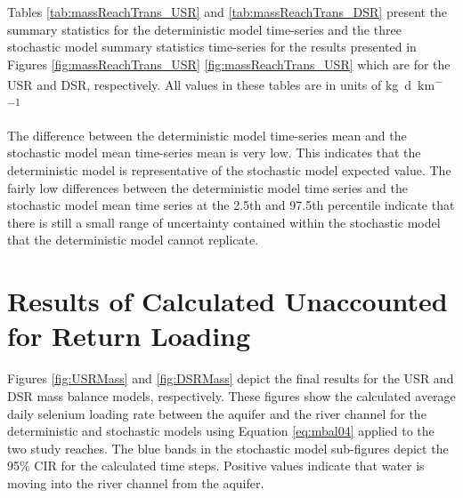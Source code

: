 Tables \ref{tab:massReachTrans_USR} and \ref{tab:massReachTrans_DSR} present the summary statistics for the deterministic model time-series and the three stochastic model summary statistics time-series for the results presented in Figures \ref{fig:massReachTrans_USR} \ref{fig:massReachTrans_USR} which are for the USR and DSR, respectively.  All values in these tables are in units of \si{\kilo\gram\per\day\per\kilo\meter}

\subtabletop
\begin{table}[htbp]
	\centering
	\caption[USR deterministic and stochastic dissolved selenium mass transport time-series results tables.]{USR deterministic and stochastic dissolved selenium mass transport time-series results tables.  Values are in units of \si{\kilo\gram\per\day\per\kilo\meter}.}
	\label{tab:massReachTrans_USR}
	
	\tablevspace
\end{table}
\begin{table}[htbp]
	\centering
	\caption[USR deterministic and stochastic dissolved selenium mass transport time-series results tables.]{USR deterministic and stochastic dissolved selenium mass transport time-series results tables.  Values are in units of \si{\kilo\gram\per\day\per\kilo\meter}.}
	\label{tab:massReachTrans_DSR}
	
\end{table}

The difference between the deterministic model time-series mean and the stochastic model mean time-series mean is very low.  This indicates that the deterministic model is representative of the stochastic model expected value.  The fairly low differences between the deterministic model time series and the stochastic model mean time series at the 2.5th and 97.5th percentile indicate that there is still a small range of uncertainty contained within the stochastic model that the deterministic model cannot replicate.
\clearpage{}


\section{Results of Calculated Unaccounted for Return Loading}
\label{sec:MassModelResults}


Figures \ref{fig:USRMass} and \ref{fig:DSRMass} depict the final results for the USR and DSR mass balance models, respectively.  These figures show the calculated average daily selenium loading rate between the aquifer and the river channel for the deterministic and stochastic models using Equation \ref{eq:mbal04} applied to the two study reaches.  The blue bands in the stochastic model sub-figures depict the 95\% CIR for the calculated time steps.  Positive values indicate that water is moving into the river channel from the aquifer.

